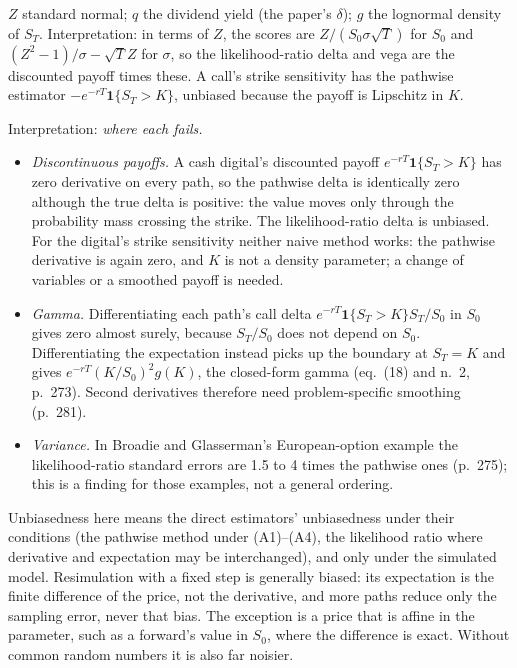 \begin{qfmethod}
 $Z$ standard normal; $q$ the dividend yield (the paper's $\delta$); $g$ the lognormal density of $S_T$. Interpretation: in terms of $Z$, the scores are $Z/(S_0\sigma\sqrt T)$ for $S_0$ and $(Z^2-1)/\sigma-\sqrt TZ$ for $\sigma$, so the likelihood-ratio delta and vega are the discounted payoff times these. A call's strike sensitivity has the pathwise estimator $-e^{-rT}\mathbf 1\{S_T>K\}$, unbiased because the payoff is Lipschitz in $K$.

 Interpretation: \emph{where each fails.}
\begin{itemize}
\item \emph{Discontinuous payoffs.} A cash digital's discounted payoff $e^{-rT}\mathbf 1\{S_T>K\}$ has zero derivative on every path, so the pathwise delta is identically zero although the true delta is positive: the value moves only through the probability mass crossing the strike. The likelihood-ratio delta is unbiased. For the digital's strike sensitivity neither naive method works: the pathwise derivative is again zero, and $K$ is not a density parameter; a change of variables or a smoothed payoff is needed.
\item \emph{Gamma.} Differentiating each path's call delta $e^{-rT}\mathbf 1\{S_T>K\}S_T/S_0$ in $S_0$ gives zero almost surely, because $S_T/S_0$ does not depend on $S_0$. Differentiating the expectation instead picks up the boundary at $S_T=K$ and gives $e^{-rT}(K/S_0)^2g(K)$, the closed-form gamma (eq.~(18) and n.~2, p.~273). Second derivatives therefore need problem-specific smoothing (p.~281).
\item \emph{Variance.} In Broadie and Glasserman's European-option example the likelihood-ratio standard errors are 1.5 to 4 times the pathwise ones (p.~275); this is a finding for those examples, not a general ordering.
\end{itemize}
Unbiasedness here means the direct estimators' unbiasedness under their conditions (the pathwise method under (A1)--(A4), the likelihood ratio where derivative and expectation may be interchanged), and only under the simulated model. Resimulation with a fixed step is generally biased: its expectation is the finite difference of the price, not the derivative, and more paths reduce only the sampling error, never that bias. The exception is a price that is affine in the parameter, such as a forward's value in $S_0$, where the difference is exact. Without common random numbers it is also far noisier.


\end{qfmethod}
